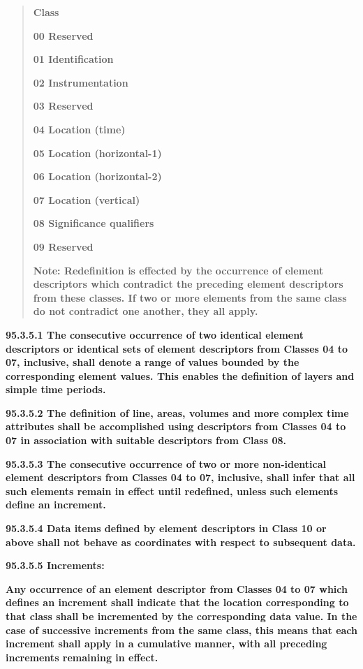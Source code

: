 \begin{quote}
\textbf{Class}

\textbf{00 Reserved}

\textbf{01 Identification}

\textbf{02 Instrumentation}

\textbf{03 Reserved}

\textbf{04 Location (time)}

\textbf{05 Location (horizontal-1)}

\textbf{06 Location (horizontal-2)}

\textbf{07 Location (vertical)}

\textbf{08 Significance qualifiers}

\textbf{09 Reserved}

\textbf{Note: Redefinition is effected by the occurrence of element descriptors which contradict the preceding element descriptors from these classes. If two or more elements from the same class do not contradict one another, they all apply.}
\end{quote}

\textbf{95.3.5.1 The consecutive occurrence of two identical element descriptors or identical sets of element descriptors from Classes 04 to 07, inclusive, shall denote a range of values bounded by the corresponding element values. This enables the definition of layers and simple time periods.}

\textbf{95.3.5.2 The definition of line, areas, volumes and more complex time attributes shall be accomplished using descriptors from Classes 04 to 07 in association with suitable descriptors from Class 08.}

\textbf{95.3.5.3 The consecutive occurrence of two or more non-identical element descriptors from Classes 04 to 07, inclusive, shall infer that all such elements remain in effect until redefined, unless such elements define an increment.}

\textbf{95.3.5.4 Data items defined by element descriptors in Class 10 or above shall not behave as coordinates with respect to subsequent data.}

\textbf{95.3.5.5 Increments:}

\textbf{Any occurrence of an element descriptor from Classes 04 to 07 which defines an increment shall indicate that the location corresponding to that class shall be incremented by the corresponding data value. In the case of successive increments from the same class, this means that each increment shall apply in a cumulative manner, with all preceding increments remaining in effect.}

